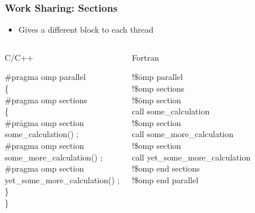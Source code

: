 \documentclass[slidestop,mathserif,compress,xcolor=svgnames]{beamer}
\newenvironment{eblock}[0]
{
\begin{beamerboxesrounded}[upper=uppercol2,lower=lowercol2,shadow=true]}
{\end{beamerboxesrounded}}
\begin{document}
\begin{frame}
  \frametitle{\small Work Sharing: Sections}
  \begin{itemize}
    \item Gives a different block to each thread
  \end{itemize}
  \begin{columns}
    \begin{eblock}{C/C++}
      \begin{tabbing}
        \#pragma omp parallel \\
        \{ \=\\
        \> \#pragma omp sections \\
        \>\{ \=\\
        \>\>\#pr\=agma omp section \\
        \>\>\> some\_calculation() ; \\
        \>\>\#pragma omp section \\
        \>\>\> some\_more\_calculation() ; \\
        \>\>\#pragma omp section \\
        \>\>\> yet\_some\_more\_calculation() ; \\
        \>\}\\
        \}
      \end{tabbing}
    \end{eblock}
    \begin{eblock}{Fortran}
      \begin{tabbing}
        !\$\=omp parallel \\
        \>!\$omp sections \\
        \>!\$\=omp section \\
        \>\> call some\_calculation \\
        \>!\$omp section \\
        \>\> call some\_more\_calculation \\
        \>!\$omp section \\
        \>\> call yet\_some\_more\_calculation \\
        \>!\$omp end sections \\
        !\$omp end parallel
      \end{tabbing}
    \end{eblock}
  \end{columns}
\end{frame}
\end{document}
